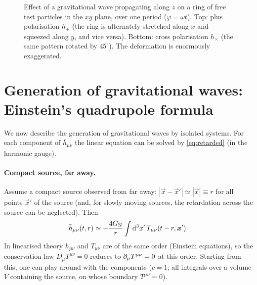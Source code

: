 \begin{figure}[ht]
\centering
{}
\caption{Effect of a gravitational wave propagating along $z$ on a ring of free test particles in the $xy$ plane, over one period ($\varphi=\omega t$). Top: plus polarisation $h_+$ (the ring is alternately stretched along $x$ and squeezed along $y$, and vice versa). Bottom: cross polarisation $h_\times$ (the same pattern rotated by $45^\circ$). The deformation is enormously exaggerated.}
\label{fig:ring}
\end{figure}

\section{Generation of gravitational waves: Einstein's quadrupole formula}

We now describe the generation of gravitational waves by isolated systems. For each component of $\bar h_{\mu\nu}$ the linear equation can be solved by \eqref{eq:retarded} (in the harmonic gauge).

\paragraph{Compact source, far away.} Assume a compact source observed from far away: $|\vec x-\vec x'|\simeq|\vec x|\equiv r$ for all points $\vec x'$ of the source (and, for slowly moving sources, the retardation across the source can be neglected). Then
\begin{equation}
  \bar h_{\mu\nu}(t,r)\simeq-\frac{4G_{\mathrm N}}{r}\int\mathrm{d}^3x'\,T_{\mu\nu}(t-r,\bm{x}').
\end{equation}
In linearised theory $h_{\mu\nu}$ and $T_{\mu\nu}$ are of the same order (Einstein equations), so the conservation law $D_\mu T^{\mu\nu}=0$ reduces to $\partial_\mu T^{\mu\nu}=0$ at this order. Starting from this, one can play around with the components ($c=1$; all integrals over a volume $V$ containing the source, on whose boundary $T^{\mu\nu}=0$).

